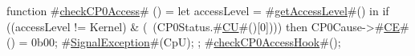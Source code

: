 function #\hyperref[zcheckCP0Access]{checkCP0Access}# () =
  {
    let accessLevel = #\hyperref[zgetAccessLevel]{getAccessLevel}#() in
    if ((accessLevel != Kernel) & (~(CP0Status.#\hyperref[zCU]{CU}#()[0]))) then
      {
        CP0Cause->#\hyperref[zCE]{CE}#() = 0b00;
        #\hyperref[zSignalException]{SignalException}#(CpU);
      };
    #\hyperref[zcheckCP0AccessHook]{checkCP0AccessHook}#();
  }
